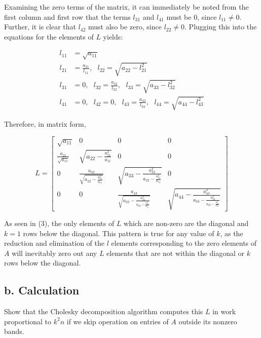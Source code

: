 \documentclass{article}
\begin{document}
		Examining the zero terms of the matrix, it can immediately be noted from the first column and first row that the terms $l_{31}$ and $l_{41}$ must be $0$, since $l_{11}\neq0$.  Further, it is clear that $l_{42}$ must also be zero, since $l_{22}\neq0$.  Plugging this into the equations for the elements of $L$ yields:
		
		\begin{align*}
			l_{11}&=\sqrt{a_{11}}\\
			l_{21}&=\frac{a_{21}}{l_{11}},\text{ }l_{22}=\sqrt{a_{22}-l_{21}^2}\\
			l_{31}&=0,\text{ }l_{32}=\frac{a_{32}}{l_{22}},\text{ }l_{33}=\sqrt{a_{33}-l_{32}^2}\\
			l_{41}&=0,\text{ }l_{42}=0,\text{ }l_{43}=\frac{a_{43}}{l_{33}},\text{ }l_{44}=\sqrt{a_{44}-l_{43}^{2}}
		\end{align*} 
		
		Therefore, in matrix form, 
		
		\begin{equation}
			L=
			\begin{bmatrix}
			\sqrt{a_{11}} & 0 & 0 & 0 \\
			\frac{a_{21}}{\sqrt{a_{11}}} & \sqrt{a_{22}-\frac{a_{21}^{2}}{a_{11}}} & 0 & 0 \\
			0 & \frac{a_{32}}{\sqrt{a_{22}-\frac{a_{21}^{2}}{a_{11}}}} & \sqrt{a_{33}-\frac{a_{32}^{2}}{a_{22}-\frac{a_{21}^{2}}{a_{11}}}} & 0 \\
			0 & 0 & \frac{a_{43}}{\sqrt{a_{33}-\frac{a_{32}^{2}}{a_{22}-\frac{a_{21}^{2}}{a_{11}}}}} & \sqrt{a_{44}-\frac{a_{43}^2}{a_{33}-\frac{a_{32}^{2}}{a_{22}-\frac{a_{21}^{2}}{a_{11}}}}}
			\end{bmatrix}
		\end{equation}
		
		As seen in (3), the only elements of $L$ which are non-zero are the diagonal and $k=1$ rows below the diagonal.  This pattern is true for any value of $k$, as the reduction and elimination of the $l$ elements corresponding to the zero elements of $A$ will inevitably zero out any $L$ elements that are not within the diagonal or $k$ rows below the diagonal.
		
		\subsection{b. Calculation}
		Show that the Cholesky decomposition algorithm computes this $L$ in work proportional to $k^{2}n$ if we skip operation on entries of $A$ outside its nonzero bands.
		
\end{document}
